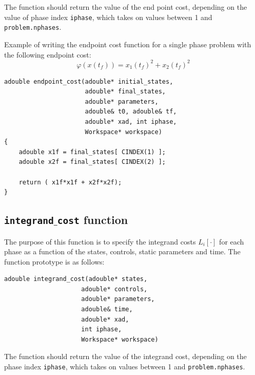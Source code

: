 \documentclass[a4paper,11pt]{report}    %
\newenvironment{shadedframe}{%
  \def\FrameCommand{\fcolorbox{black}{shadecolor}}%
  \MakeFramed {\FrameRestore}}
{\endMakeFramed}
\begin{document}
\noindent The function should return the value of the end point cost, depending on
the value of phase index \verb|iphase|, which takes on values between 1 and \verb|problem.nphases|.

\begin{shadedframe}
  Example of writing the endpoint cost function for a single phase problem with  the following endpoint
cost:
   \begin{equation}
        \varphi(x(t_f)) = x_1(t_f)^2 + x_2(t_f)^2
   \end{equation}

\begin{verbatim}
adouble endpoint_cost(adouble* initial_states, 
                      adouble* final_states, 
                      adouble* parameters,
                      adouble& t0, adouble& tf, 
                      adouble* xad, int iphase,
                      Workspace* workspace)
{
    adouble x1f = final_states[ CINDEX(1) ];
    adouble x2f = final_states[ CINDEX(2) ];

    return ( x1f*x1f + x2f*x2f);
}
\end{verbatim}


\end{shadedframe}



\subsection{\texttt{integrand$\_$cost} function}

The purpose of this function is to specify the integrand costs $L_i[\cdot]$ for each phase as a function of
the states, controls, static parameters and time.
The function prototype is as follows:

\begin{verbatim}
adouble integrand_cost(adouble* states, 
                     adouble* controls, 
                     adouble* parameters, 
                     adouble& time, 
                     adouble* xad, 
                     int iphase,
                     Workspace* workspace)
\end{verbatim}

\noindent The function should return the value of the integrand cost, depending on
 the phase index \verb|iphase|, 
which takes on values between 1 and \verb|problem.nphases|.
\end{document}

